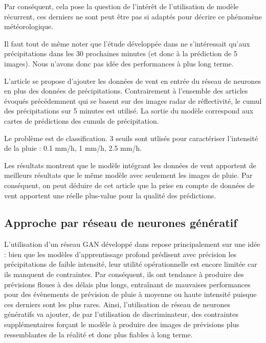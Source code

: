 \documentclass[12pt,a4paper,french]{article}
\newcommand\subsecspacing{1cm}
\begin{document}
Par conséquent, cela pose la question de l'intérêt de l'utilisation de modèle récurrent, ces derniers ne sont peut être pas si adaptés pour décrire ce phénomène météorologique. \newline

Il faut tout de même noter que l'étude développée dans \cite{9508500} ne s'intéressait qu'aux précipitations dans les 30 prochaines minutes (et donc à la prédiction de 5 images). Nous n'avons donc pas idée des performances à plus long terme. \newline

L'article \cite{bouget:hal-03112093} se propose d'ajouter les données de vent en entrée du réseau de neurones en plus des données de précipitations. Contrairement à l'ensemble des articles évoqués précédemment qui se basent sur des images radar de réflectivité, le cumul des précipitations sur 5 minutes est utilisé. La sortie du modèle correspond aux cartes de prédictions des cumuls de précipitation. 

Le problème est de classification. 3 seuils sont utlisés pour caractériser l'intensité de la pluie : 0.1 mm/h, 1 mm/h, 2.5 mm/h. 

Les résultats montrent que le modèle intégrant les données de vent apportent de meilleurs résultats que le même modèle avec seulement les images de pluie. Par conséquent, on peut déduire de cet article que la prise en compte de données de vent apportent une réelle plus-value pour la qualité des prédictions. 

\vspace{\subsecspacing}

\subsection{Approche par réseau de neurones génératif}

L'utilisation d'un réseau GAN développé dans \cite{Ravuri2021SkilfulPN} repose principalement sur une idée : bien que les modèles d'apprentissage profond prédisent avec précision les précipitations de faible intensité, leur utilité opérationnelle est encore limitée car ils manquent de contraintes. Par conséquent, ils ont tendance à produire des prévisions floues à des délais plus longs, entraînant de mauvaises performances pour des évènements de prévision de pluie à moyenne ou haute intensité puisque ces derniers sont les plus rares. Ainsi, l'utilisation de réseau de neurones génératifs va ajouter, de par l'utilisation de discriminateur, des contraintes supplémentaires forçant le modèle à produire des images de prévisions plus ressemblantes de la réalité et donc plus fiables à long terme. \newline
\end{document}
